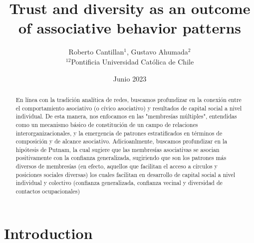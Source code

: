 



\usepackage{xcolor}



\title{Trust and diversity as an outcome of associative behavior patterns}
\author{Roberto Cantillan$^{1}$, Gustavo Ahumada$^{2}$ \\
        \small $^{12}$Pontificia Universidad Católica de Chile \\
}

\date{Junio 2023}



\maketitle


\begin{abstract}
En línea con la tradición analítica de redes, buscamos profundizar en la conexión entre el comportamiento asociativo (o cívico asociativo) y resultados de capital social a nivel individual. De esta manera, nos enfocamos en las "membresías múltiples", entendidas como un mecanismo básico de constitución de un campo de relaciones interorganizacionales, y la emergencia de patrones estratificados en términos de composición y de alcance asociativo. Adicioanlmente, buscamos profundizar en la hipótesis de Putnam, la cual sugiere que las membresías asociativas se asocian positivamente con la confianza generalizada, sugiriendo que son los patrones más diversos de membresías (en efecto, aquellos que facilitan el acceso a círculos y posiciones sociales diversas) los cuales facilitan en desarrollo de capital social a nivel individual y colectivo (confianza generalizada, confianza vecinal y diversidad de contactos ocupacionales)
\end{abstract}
\hspace{10pt}


\newpage


\maketitle

\section{Introduction}

